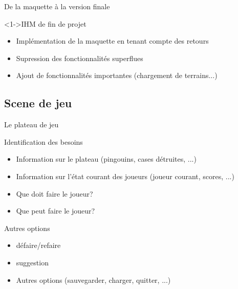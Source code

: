 \documentclass{beamer}
\begin{document}
\begin{frame}{De la maquette à la version finale}
  \begin{block}<1->{IHM de fin de projet}
	\begin{itemize}
	\item <1-> Implémentation de la maquette en tenant compte des retours
	\item <2-> Supression des fonctionnalités superflues
	\item <3-> Ajout de fonctionnalités importantes (chargement de terrains...)
  	\end{itemize}
  \end{block}
\end{frame}

\subsection{Scene de jeu}

\begin{frame}{Le plateau de jeu}
  \begin{block}{Identification des besoins}
    \begin{itemize}
    \item <1-> Information sur le plateau (pingouins, cases détruites, ...)
    \item <2-> Information sur l'état courant des joueurs (joueur courant, scores, ...)
    \item <3-> Que doit faire le joueur?
    \item <4-> Que peut faire le joueur?
    \end{itemize}
  \end{block}
\end{frame}

\begin{frame}{}
  \begin{block}{Autres options}
    \begin{itemize}
    \item <1-> défaire/refaire
    \item <2-> suggestion
    \item <3-> Autres options (sauvegarder, charger, quitter, ...)
    \end{itemize}
  \end{block}
\end{frame}
\end{document}
